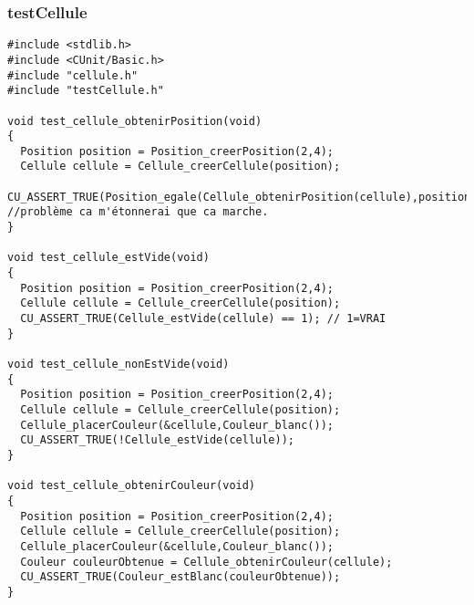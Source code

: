 \subsubsection{testCellule}
\usepackage[T1]{fontenc}
\usepackage[english]{babel}
\usepackage{fullpage}
\usepackage{color}
\usepackage[table]{xcolor}
\usepackage{listings}
 
 
 

 
\begin{lstlisting}
#include <stdlib.h>
#include <CUnit/Basic.h>
#include "cellule.h"
#include "testCellule.h"

void test_cellule_obtenirPosition(void)
{
  Position position = Position_creerPosition(2,4);
  Cellule cellule = Cellule_creerCellule(position);
  CU_ASSERT_TRUE(Position_egale(Cellule_obtenirPosition(cellule),position)); //problème ca m'étonnerai que ca marche.
}

void test_cellule_estVide(void)
{
  Position position = Position_creerPosition(2,4);
  Cellule cellule = Cellule_creerCellule(position);
  CU_ASSERT_TRUE(Cellule_estVide(cellule) == 1); // 1=VRAI
}

void test_cellule_nonEstVide(void)
{
  Position position = Position_creerPosition(2,4);
  Cellule cellule = Cellule_creerCellule(position);
  Cellule_placerCouleur(&cellule,Couleur_blanc());
  CU_ASSERT_TRUE(!Cellule_estVide(cellule));
}

void test_cellule_obtenirCouleur(void)
{
  Position position = Position_creerPosition(2,4);
  Cellule cellule = Cellule_creerCellule(position);
  Cellule_placerCouleur(&cellule,Couleur_blanc());
  Couleur couleurObtenue = Cellule_obtenirCouleur(cellule);
  CU_ASSERT_TRUE(Couleur_estBlanc(couleurObtenue));
}
\end{lstlisting}
 
